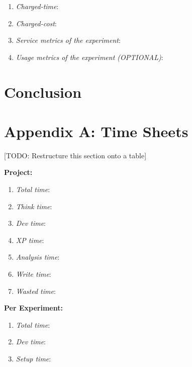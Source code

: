 \documentclass[a4paper]{IEEEtran}
\begin{document}
\begin{enumerate}
  \item{\emph{Charged-time}: }
  \item{\emph{Charged-cost}: }
  \item{\emph{Service metrics of the experiment}: }
  \item{\emph{Usage metrics of the experiment (OPTIONAL)}: }
\end{enumerate}

\section{Conclusion} \label{conclusion}




\section*{Appendix A: Time Sheets}

[TODO: Restructure this section onto a table]

\textbf{Project:}
\begin{enumerate}
  \item{\emph{Total time}: }
  \item{\emph{Think time}: }
  \item{\emph{Dev time}: }
  \item{\emph{XP time}: }
  \item{\emph{Analysis time}: }
  \item{\emph{Write time}: }
  \item{\emph{Wasted time}: }
\end{enumerate}

\textbf{Per Experiment:}
\begin{enumerate}
  \item{\emph{Total time}: }
  \item{\emph{Dev time}: }
  \item{\emph{Setup time}: }
\end{enumerate}
\end{document}

